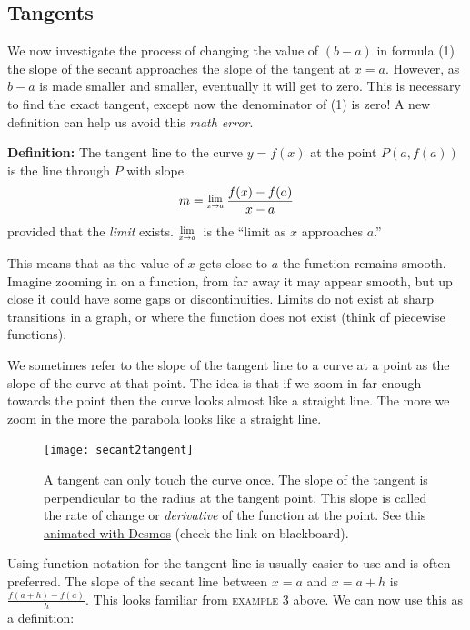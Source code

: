 \subsection*{Tangents}
We now investigate the process of changing the value of $(b -a)$ in formula (1) the slope of the secant approaches the slope of the tangent at $x =a$. However, as $b -a$ is made smaller and smaller, eventually it will get to zero. This is necessary to find the exact tangent, except now the denominator of (1) is zero! A new definition can help us avoid this \textit{math error}. 
\begin{tcolorbox}
\textbf{Definition:} The tangent line to the curve $y =f (x)$ at the point $P (a ,f (a))$ is the line through $P$ with slope \[m =\Lim{x\to a}\frac{f (x) -f (a)}{x -a}\] provided that the \textit{limit} exists. $\Lim{x\to a}$ is the ``limit as $x$ approaches $a$.''
\end{tcolorbox}
This means that as the value of $x$ gets close to $a$ the function remains smooth. Imagine zooming in on a function, from far away it may appear smooth, but up close it could have some gaps or discontinuities.  Limits do not exist at sharp transitions in a graph, or where the function does not exist (think of piecewise functions). 

We sometimes refer to the slope of the tangent line to a curve at a point as the slope of the curve at that point. The idea is that if we zoom in far enough towards the point then the curve looks almost like a straight line. The more we zoom in the more the parabola looks like a straight line. 

\begin{figure}\begin{center}
		\texttt{[image: secant2tangent]}
		\caption{A tangent can only touch the curve once. The slope of the tangent is perpendicular to the radius at the tangent point. This slope is called the rate of change or \textit{derivative} of the function at the point. See this \href{https://www.desmos.com/calculator/ialy1tknoo}{animated with Desmos} (check the link on blackboard).}\end{center}
\end{figure}

Using function notation for the tangent line is usually easier to use and is often preferred. The slope of the secant line between $x =a$ and $x =a +h$ is $\displaystyle \frac{f (a +h) -f (a)}{h}$. This looks familiar from \textsc{example} 3 above. We can now use this as a definition:


